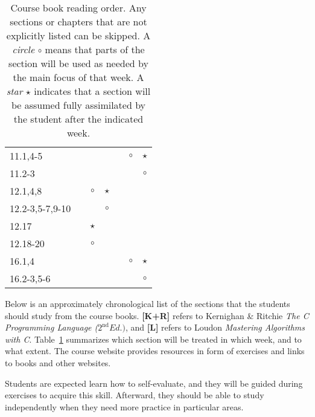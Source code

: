 \documentclass[a4paper]{article}
\newcommand{\refl}{\textbf{[L]}\xspace}
\newcommand{\refkr}{\textbf{[K+R]}\xspace}
\begin{document}
\begin{table}
\begin{minipage}[t]{0.5\columnwidth}
\begin{tabular}{|l|c|c|c|c|c|c|}
    \hline
    11.1,4-5           &         &         &         &         & $\circ$ & $\star$ \\
    11.2-3             &         &         &         &         &         & $\circ$ \\
    \hline
    12.1,4,8           &         & $\circ$ & $\star$ &         &         &         \\
    12.2-3,5-7,9-10    &         &         & $\circ$ &         &         &         \\
    12.17              &         & $\star$ &         &         &         &         \\
    12.18-20           &         & $\circ$ &         &         &         &         \\
    \hline
    16.1,4             &         &         &         &         & $\circ$ & $\star$ \\
    16.2-3,5-6         &         &         &         &         &         & $\circ$ \\
    \hline
  \end{tabular}
  \end{minipage}
  \caption{
    Course book reading order.
    Any sections or chapters that are not explicitly listed can be skipped.
    A \emph{circle} $\circ$ means that parts of the section will be used as needed by the main focus of that week.
    A \emph{star} $\star$ indicates that a section will be assumed fully assimilated by the student after the indicated week.
  }\label{tab:reading-guide}
\end{table}

Below is an approximately chronological list of the sections that the students should study from the course books.
\refkr refers to Kernighan \& Ritchie \emph{The C Programming Language ($2^\text{nd} Ed.)$}, and \refl refers to Loudon \emph{Mastering Algorithms with C}.
Table~\ref{tab:reading-guide} summarizes which section will be treated in which week, and to what extent.
The course website provides resources in form of exercises and links to books and other websites.

Students are expected learn how to self-evaluate, and they will be guided during exercises to acquire this skill.
Afterward, they should be able to study independently when they need more practice in particular areas.
\end{document}
